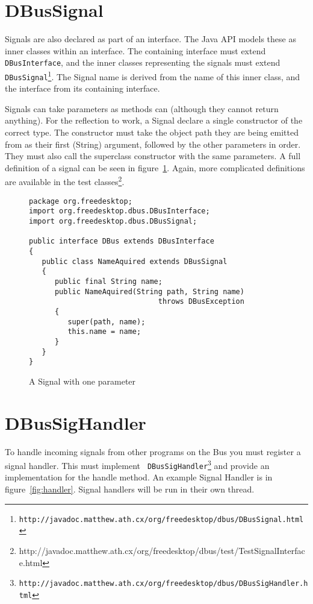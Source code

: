 \documentclass[a4paper,12pt]{article}
\begin{document}
\section{DBusSignal}

Signals are also declared as part of an interface. The Java API
models these as inner classes within an interface. The containing
interface must extend {\tt DBusInterface}, and the inner classes
representing the signals must extend {\tt
DBusSignal\footnote{http://javadoc.matthew.ath.cx/org/freedesktop/dbus/DBusSignal.html}}.
The Signal name is derived from the name of this inner class, and
the interface from its containing interface.

Signals can take parameters as methods can (although they cannot return
      anything). For the reflection to work, a Signal declare a single
constructor of the correct type. The constructor must  take the object path
they are being emitted from as their first (String) argument, followed by the
other parameters in order. They must also call the superclass constructor with
the same parameters.  A full definition of a signal can be seen in
figure~\ref{fig:signal}. Again, more complicated definitions are available in
the test
classes\footnote{http://javadoc.matthew.ath.cx/org/freedesktop/dbus/test/TestSignalInterface.html}.

\begin{figure}[htb]
\begin{center}
\begin{verbatim}
package org.freedesktop;
import org.freedesktop.dbus.DBusInterface;
import org.freedesktop.dbus.DBusSignal;

public interface DBus extends DBusInterface
{
   public class NameAquired extends DBusSignal
   {
      public final String name;
      public NameAquired(String path, String name) 
                              throws DBusException
      {
         super(path, name);
         this.name = name;
      }
   }
}
\end{verbatim}
\end{center}
\caption{A Signal with one parameter}
\label{fig:signal}
\end{figure}

\section{DBusSigHandler}

To handle incoming signals from other programs on the Bus you must
register a signal handler. This must implement {\tt
DBusSigHandler\footnote{http://javadoc.matthew.ath.cx/org/freedesktop/dbus/DBusSigHandler.html}}
and provide an implementation for the handle method. An example Signal Handler is in figure~\ref{fig:handler}. Signal handlers will be run in their own thread.
\end{document}
